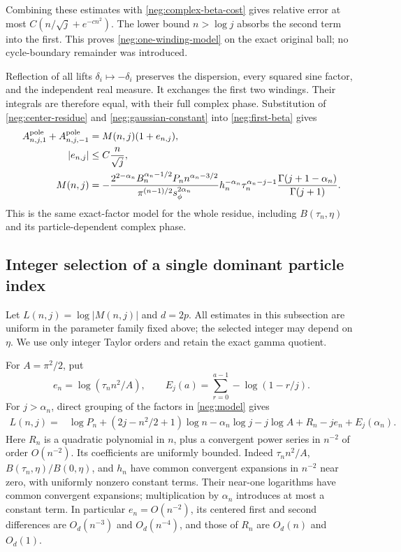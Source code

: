 \documentclass[11pt]{article}
\numberwithin{equation}{section}
\theoremstyle{definition}
\begin{document}
Combining these estimates with \eqref{neg:complex-beta-cost}
gives relative error at most
\(C(n/\sqrt j+e^{-cn^2})\).  The lower bound \(n>\log j\)
absorbs the second term into the first.  This proves
\eqref{neg:one-winding-model} on the exact original ball; no
cycle-boundary remainder was introduced.

Reflection of all lifts \(\delta_i\mapsto-\delta_i\) preserves
the dispersion, every squared sine factor, and the independent
real measure.  It exchanges the first two windings.  Their
integrals are therefore equal, with their full complex phase.
Substitution of \eqref{neg:center-residue} and
\eqref{neg:gaussian-constant} into \eqref{neg:first-beta} gives
\begin{align}
 A^{\rm pole}_{n,j,1}+A^{\rm pole}_{n,j,-1}
   &=M(n,j)(1+e_{n,j}),\label{neg:local-model}\\
 |e_{n,j}|&\le C\frac n{\sqrt j},\label{neg:local-error}\\
 M(n,j)&=-\frac{2^{2-\alpha_n}B_n^{\alpha_n-1/2}P_n
                        n^{\alpha_n-3/2}}
              {\pi^{(n-1)/2}s_\phi^{2\alpha_n}}
      h_n^{-\alpha_n}\tau_n^{\alpha_n-j-1}
       \frac{\Gamma(j+1-\alpha_n)}{\Gamma(j+1)}.
       \label{neg:model}
\end{align}
This is the same exact-factor model for the whole residue, including
\(B(\tau_n,\eta)\) and its particle-dependent complex phase.



\subsection{Integer selection of a single dominant particle index}
\label{neg:dominance}

Let \(L(n,j)=\log|M(n,j)|\) and \(d=2p\).  All estimates in
this subsection are uniform in the parameter family fixed above;
the selected integer may depend on \(\eta\).  We use only integer
Taylor orders and retain the exact gamma quotient.

For \(A=\pi^2/2\), put
\[
 e_n=\log(\tau_n n^2/A),\qquad
 E_j(a)=\sum_{r=0}^{a-1}-\log(1-r/j).
\]
For \(j>\alpha_n\), direct grouping of the factors in
\eqref{neg:model} gives
\begin{equation}
 \begin{split}
 L(n,j)={}&\log P_n+(2j-n^2/2+1)\log n-\alpha_n\log j
       -j\log A+R_n-je_n+E_j(\alpha_n).
 \end{split}
 \label{neg:L-exact}
\end{equation}
Here \(R_n\) is a quadratic polynomial in \(n\), plus a convergent
power series in \(n^{-2}\) of order \(O(n^{-2})\).  Its coefficients
are uniformly bounded.  Indeed \(\tau_n n^2/A\),
\(B(\tau_n,\eta)/B(0,\eta)\), and \(h_n\) have common convergent
expansions in \(n^{-2}\) near zero, with uniformly nonzero constant
terms.  Their near-one logarithms have common convergent expansions;
multiplication by \(\alpha_n\) introduces at most a constant term.
In particular \(e_n=O(n^{-2})\), its centered first and second
differences are \(O_d(n^{-3})\) and \(O_d(n^{-4})\), and those of
\(R_n\) are \(O_d(n)\) and \(O_d(1)\).
\end{document}
